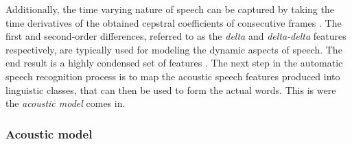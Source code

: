 \documentclass[english, 12pt, a4paper, pdftex, elec, utf8]{aaltothesis}
\begin{document}
Additionally, the time varying nature of speech can be captured by taking the time derivatives of the obtained cepstral coefficients of consecutive frames \cite{gales2008application, kallasjoki2016}. The first and second-order differences, referred to as the \textit{delta} and \textit{delta-delta} features respectively, are typically used for modeling the dynamic aspects of speech. The end result is a highly condensed set of features \cite{huang2001spoken, gales2008application}. The next step in the automatic speech recognition process is to map the acoustic speech features produced into linguistic classes, that can then be used to form the actual words. This is were the \textit{acoustic model} comes in.

\subsubsection{Acoustic model}
\end{document}
